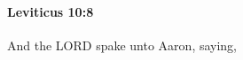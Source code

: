 
		\paragraph{Leviticus 10:8} %
			\label{LEVITICUS-10-8}

			And the LORD spake unto Aaron, saying,


